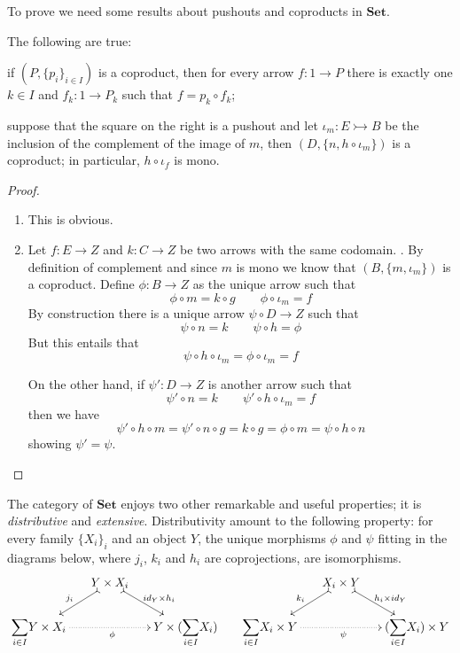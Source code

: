 \documentclass[a4paper,UKenglish,cleveref,pdftex,thm-restate,numberwithinsect]{lipics-v2021}
\newcommand{\Set}{\mathbf{Set}}
\newcommand{\Sum}{\mathlarger{\sum}}
\newcommand{\mto}{\rightarrowtail}
\newcommand{\id}[1]{\mathsf{id}_{#1}}
\begin{document}
To prove  we need some results about pushouts and coproducts in $\Set$.


\begin{lemma}\label{lem:po_set}
	The following are true:
	\begin{enumerate}
		\item if $(P, \{p_i\}_{i\in I})$ is a coproduct, then for every arrow $f\colon 1\to P$ there is exactly one $k\in I$ and $f_k\colon 1\to P_k$ such that $f=p_k\circ f_k$;
		
		\parbox{11cm}{
		\item suppose that the square on the right is a pushout and let $\iota_{m}\colon E\mto B$ be the inclusion of the complement of the image of $m$, then $(D, \{n, h\circ \iota_m \})$ is a coproduct; in particular, $h\circ \iota_f$ is mono.}\hfill \parbox{2cm}{}
	\end{enumerate}
\end{lemma}
\begin{proof}
	\begin{enumerate}
		\item This is obvious.
		\item Let $f\colon E\to Z$ and $k\colon C\to Z$ be two arrows with the same codomain. . By definition of complement and since $m$ is mono we know that $(B, \{m, \iota_m\})$ is a coproduct. Define $\phi\colon B\to Z$ as the unique arrow such that \[\phi\circ m=k\circ g \qquad \phi \circ \iota_m=f\] 
		By construction there is a unique arrow $\psi \circ D\to Z$ such that 
		\[\psi \circ n=k \qquad \psi \circ h=\phi \]
		But this entails that 
		\[
		\psi \circ h\circ \iota_m =\phi \circ \iota_m=f\]
		
		On the other hand, if $\psi'\colon D\to Z$ is another arrow such that
		\[\psi' \circ n=k \qquad \psi' \circ h\circ \iota_m=f \]
		then we have
		\[\psi'\circ h\circ m=\psi'\circ n\circ g=k\circ g=\phi \circ m =\psi \circ h\circ n \]
		showing $\psi'=\psi$. \qedhere
	\end{enumerate}
\end{proof}



The category of $\Set$ enjoys two other remarkable and useful properties; it is \emph{distributive} and \emph{extensive}. Distributivity amount to the following property: for every family $\{X_i\}_{i}$ and an object $Y$, the unique morphisms $\phi$ and $\psi $ fitting in the diagrams below, where $j_i$, $k_i$ and $h_i$ are coprojections, are isomorphisms.
\[\xymatrix@C=15pt@R=15pt{&Y\times X_i \ar@{>->}[dl]_{j_i} \ar@{>->}[dr]^{\id{Y}\times h_i} &&&X_i \times Y \ar@{>->}[dl]_{k_i} \ar@{>->}[dr]^{ h_i \times \id{Y}} \\ \Sum_{i\in I} Y\times X_i \ar@{.>}[rr]_{\phi}&& Y\times (\Sum_{i\in I}X_i) & \Sum_{i\in I}  X_i \times Y \ar@{.>}[rr]_{\psi}&&  (\Sum_{i\in I}X_i) \times Y }\]
\end{document}
